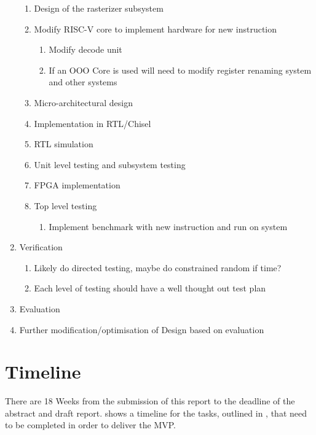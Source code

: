 \begin{enumerate}
\begin{enumerate}
        \item Design of the rasterizer subsystem
        \item Modify RISC-V core to implement hardware for new instruction
        \begin{enumerate}
            \item Modify decode unit
            \item If an OOO Core is used will need to modify register renaming system and other systems
        \end{enumerate}
        \item Micro-architectural design
        \item Implementation in RTL/Chisel
        \item RTL simulation
        \item Unit level testing and subsystem testing
        \item FPGA implementation
        \item Top level testing
        \begin{enumerate}
            \item Implement benchmark with new instruction and run on system
        \end{enumerate}
    \end{enumerate}
    
    \item Verification
    \begin{enumerate}
        \item Likely do directed testing, maybe do constrained random if time? 
        \item Each level of testing should have a well thought out test plan
    \end{enumerate}
    \item Evaluation
    \item Further modification/optimisation of Design based on evaluation
        
\end{enumerate}

\section{Timeline}
There are 18 Weeks from the submission of this report to the deadline of the abstract and draft report.  shows a timeline for the tasks, outlined in , that need to be completed  in order to deliver the MVP. 

